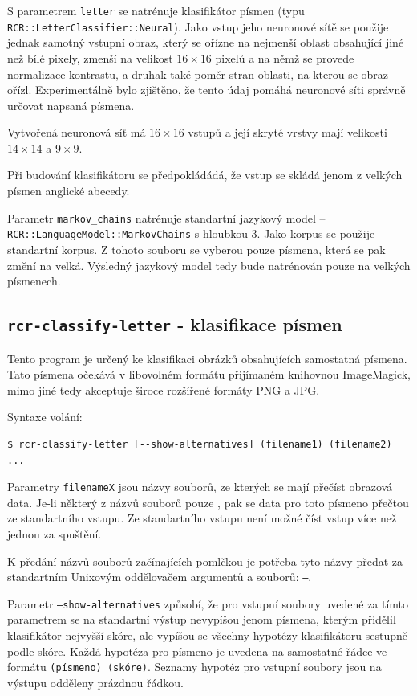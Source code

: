 \documentclass[a4paper]{article}
\begin{document}
S parametrem \texttt{letter} se natrénuje klasifikátor
písmen (typu \texttt{RCR::LetterClassifier::Neural}). Jako
vstup jeho neuronové sítě se použije jednak samotný vstupní obraz,
který se ořízne na nejmenší oblast obsahující jiné než bílé pixely,
zmenší na velikost $16\times 16$ pixelů a na němž se provede normalizace
kontrastu, a druhak také poměr stran oblasti, na kterou se obraz ořízl.
Experimentálně bylo zjištěno, že tento údaj pomáhá neuronové síti správně
určovat napsaná písmena.

Vytvořená neuronová síť má $16\times 16$ vstupů a její skryté vrstvy mají
velikosti $14\times 14$ a $9\times 9$.

Při budování klasifikátoru se předpokládádá, že vstup se skládá jenom
z velkých písmen anglické abecedy.

Parametr \texttt{markov\_chains} natrénuje standartní jazykový model --
\texttt{RCR::LanguageModel::MarkovChains} s hloubkou 3. Jako korpus se použije
standartní korpus. Z tohoto souboru se vyberou pouze písmena, která se pak změní
na velká. Výsledný jazykový model tedy bude natrénován pouze na velkých
písmenech.

\subsection{\texttt{rcr-classify-letter} - klasifikace písmen}
Tento program je určený ke klasifikaci obrázků obsahujících samostatná písmena.
Tato písmena očekává v libovolném formátu přijímaném knihovnou ImageMagick,
mimo jiné tedy akceptuje široce rozšířené formáty PNG a JPG.

Syntaxe volání:
\begin{lstlisting}
$ rcr-classify-letter [--show-alternatives] (filename1) (filename2) ...
\end{lstlisting}

Parametry \texttt{filenameX} jsou názvy souborů, ze kterých se mají přečíst
obrazová data. Je-li některý z názvů souborů pouze \uv{\texttt{-}}, pak se data
pro toto písmeno přečtou ze standartního vstupu. Ze standartního vstupu
není možné číst vstup více než jednou za spuštění.

K předání názvů souborů začínajících pomlčkou je potřeba tyto názvy předat
za standartním Unixovým oddělovačem argumentů a souborů: \texttt{--}.

Parametr \texttt{--show-alternatives} způsobí, že pro vstupní soubory
uvedené za tímto parametrem se na standartní výstup nevypíšou jenom
písmena, kterým přidělil klasifikátor nejvyšší skóre, ale vypíšou se
všechny hypotézy klasifikátoru sestupně podle skóre. Každá hypotéza
pro písmeno je uvedena na samostatné řádce ve formátu \texttt{(písmeno)
(skóre)}. Seznamy hypotéz pro vstupní soubory jsou na výstupu odděleny prázdnou
řádkou.
\end{document}
